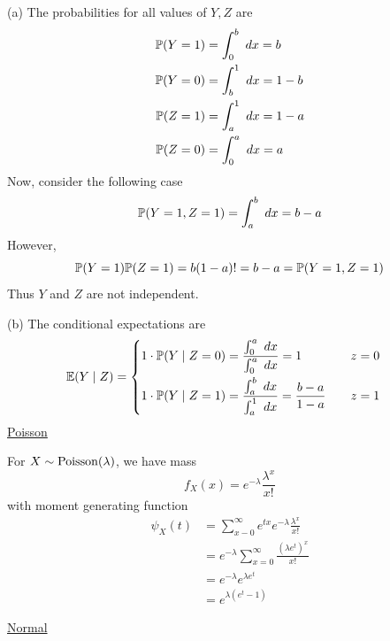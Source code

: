 \documentclass[a4paper]{article}
\begin{document}
(a) The probabilities for all values of \(Y,Z\) are
\begin{align*}
	\mathbb{P}(Y=1) & = \int^{b}_{0}  \ dx  = b \\
	\mathbb{P}(Y=0) & = \int^{1}_{b}  \ dx = 1-b  \\ 
	\mathbb{P}(Z=1) & = \int^{1}_{a}  \ dx = 1-a \\
	\mathbb{P}(Z=0) & = \int^{a}_{0}  \ dx = a 
\end{align*}
Now, consider the following case
\[
	\mathbb{P}(Y=1,Z=1) = \int^{b}_{a}  \ dx = b-a 
\]
However,
\[
	\mathbb{P}(Y=1)\mathbb{P}(Z=1) = b(1-a) != b-a = \mathbb{P}(Y=1,Z=1)
\]
Thus \(Y\) and \(Z\) are not independent.

\par (b) The conditional expectations are
\[
	\mathbb{E}(Y  \mid  Z) = \begin{cases}
		\begin{aligned}
		& 1 \cdot \mathbb{P}(Y  \mid  Z=0) = \frac{\int^{a}_{0}  \ dx }{\int^{a}_{0}  \ dx } = 1 & \quad z = 0 \\
		& 1 \cdot \mathbb{P}(Y  \mid  Z=1) = \frac{\int^{b}_{a}  \ dx }{\int^{1}_{a}  \ dx } = \frac{b-a}{1-a} & \quad z = 1 \\
	\end{aligned}
	\end{cases}
\]
\newpage
\underline{Poisson}

For \(X \sim \operatorname{Poisson}(\lambda )\), we have mass
\[
	f_{X}(x) = e^{-\lambda } \frac{\lambda^{x}}{x!}
\]
with moment generating function
\begin{align*}
	\psi_{X}(t) & = \sum_{x-0}^{\infty} e^{tx} e^{-\lambda } \frac{\lambda^{x}}{x!} \\
	 & = e^{-\lambda } \sum_{x=0}^{\infty} \frac{(\lambda e^{t})^{x}}{x!} \\ 
	 & = e^{-\lambda } e^{\lambda e^{t}} \\
	 & = \boxed{e^{\lambda (e^{t} - 1)}}
\end{align*}

\underline{Normal}
\end{document}
